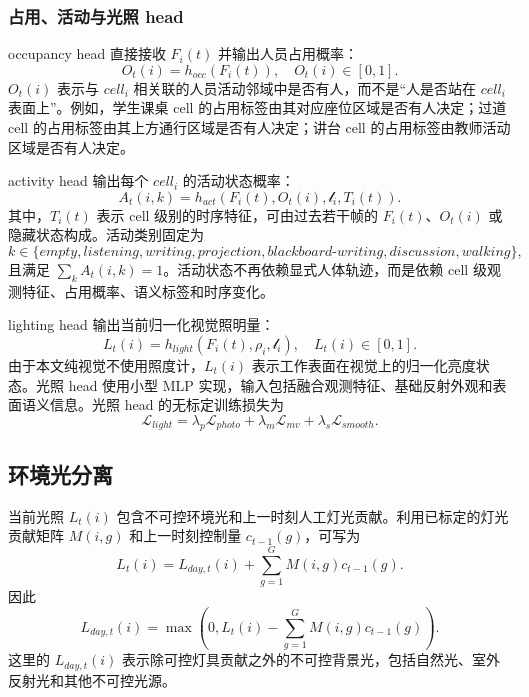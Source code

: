 \documentclass[UTF8,a4paper,zihao=-4]{ctexart}
\begin{document}
\subsubsection{占用、活动与光照 head}

occupancy head 直接接收 $F_i(t)$ 并输出人员占用概率：
\begin{equation}
O_t(i)=h_{occ}(F_i(t)),\quad O_t(i)\in[0,1].
\end{equation}
$O_t(i)$ 表示与 $cell_i$ 相关联的人员活动邻域中是否有人，而不是“人是否站在 $cell_i$ 表面上”。例如，学生课桌 cell 的占用标签由其对应座位区域是否有人决定；过道 cell 的占用标签由其上方通行区域是否有人决定；讲台 cell 的占用标签由教师活动区域是否有人决定。

activity head 输出每个 $cell_i$ 的活动状态概率：
\begin{equation}
A_t(i,k)=h_{act}(F_i(t),O_t(i),\mathcal{l}_i,T_i(t)).
\end{equation}
其中，$T_i(t)$ 表示 cell 级别的时序特征，可由过去若干帧的 $F_i(t)$、$O_t(i)$ 或隐藏状态构成。活动类别固定为
\begin{equation}
k\in\{empty,listening,writing,projection,blackboard\text{-}writing,discussion,walking\},
\end{equation}
且满足 $\sum_k A_t(i,k)=1$。活动状态不再依赖显式人体轨迹，而是依赖 cell 级观测特征、占用概率、语义标签和时序变化。

lighting head 输出当前归一化视觉照明量：
\begin{equation}
L_t(i)=h_{light}(F_i(t),\rho_i,\mathcal{l}_i),\quad L_t(i)\in[0,1].
\end{equation}
由于本文纯视觉不使用照度计，$L_t(i)$ 表示工作表面在视觉上的归一化亮度状态。光照 head 使用小型 MLP 实现，输入包括融合观测特征、基础反射外观和表面语义信息。光照 head 的无标定训练损失为
\begin{equation}
\mathcal{L}_{light}=\lambda_p\mathcal{L}_{photo}+\lambda_m\mathcal{L}_{mv}+\lambda_s\mathcal{L}_{smooth}.
\end{equation}

\subsection{环境光分离}

当前光照 $L_t(i)$ 包含不可控环境光和上一时刻人工灯光贡献。利用已标定的灯光贡献矩阵 $M(i,g)$ 和上一时刻控制量 $c_{t-1}(g)$，可写为
\begin{equation}
L_t(i)=L_{day,t}(i)+\sum_{g=1}^{G}M(i,g)c_{t-1}(g).
\end{equation}
因此
\begin{equation}
L_{day,t}(i)=\max\left(0,L_t(i)-\sum_{g=1}^{G}M(i,g)c_{t-1}(g)\right).
\end{equation}
这里的 $L_{day,t}(i)$ 表示除可控灯具贡献之外的不可控背景光，包括自然光、室外反射光和其他不可控光源。
\end{document}
